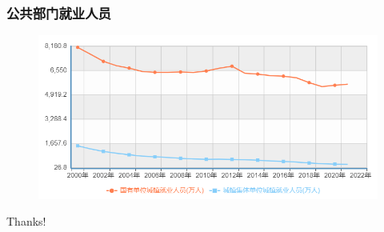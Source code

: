 \documentclass[aspectratio=169, 12pt]{beamer}
\begin{document}
\begin{frame}[plain]
    \frametitle{公共部门就业人员}
    \begin{figure}
        \centering
        \includegraphics[width=1.0\textwidth]{./resources/figure/employment.png}
    \end{figure}
\end{frame}

\begin{frame}[standout]
    \begin{center}
        {\Huge\calligra Thanks!}
      \end{center}
\end{frame}
\end{document}
